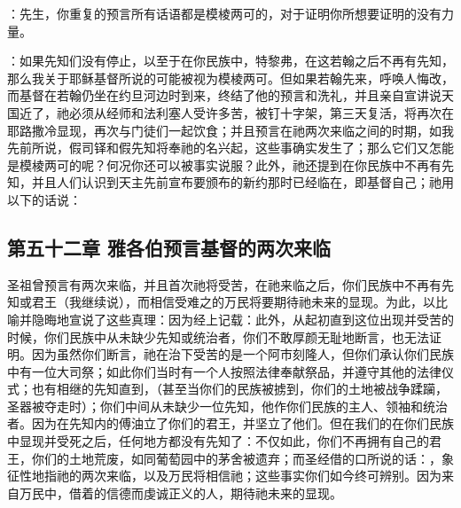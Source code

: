 ：先生，你重复的预言所有话语都是模棱两可的，对于证明你所想要证明的没有力量。\par

：如果先知们没有停止，以至于在你民族中，特黎弗，在这若翰之后不再有先知，那么我关于耶稣基督所说的可能被视为模棱两可。但如果若翰先来，呼唤人悔改，而基督在若翰仍坐在约旦河边时到来，终结了他的预言和洗礼，并且亲自宣讲说天国近了，祂必须从经师和法利塞人受许多苦，被钉十字架，第三天复活，将再次在耶路撒冷显现，再次与门徒们一起饮食；并且预言在祂两次来临之间的时期，如我先前所说，假司铎和假先知将奉祂的名兴起，这些事确实发生了；那么它们又怎能是模棱两可的呢？何况你还可以被事实说服？此外，祂还提到在你民族中不再有先知，并且人们认识到天主先前宣布要颁布的新约那时已经临在，即基督自己；祂用以下的话说：\par


\subsection{第五十二章 雅各伯预言基督的两次来临}

圣祖曾预言有两次来临，并且首次祂将受苦，在祂来临之后，你们民族中不再有先知或君王（我继续说），而相信受难之的万民将要期待祂未来的显现。为此，以比喻并隐晦地宣说了这些真理：因为经上记载：此外，从起初直到这位出现并受苦的时候，你们民族中从未缺少先知或统治者，你们不敢厚颜无耻地断言，也无法证明。因为虽然你们断言，祂在治下受苦的是一个阿市刻隆人，但你们承认你们民族中有一位大司祭；如此你们当时有一个人按照法律奉献祭品，并遵守其他的法律仪式；也有相继的先知直到，（甚至当你们的民族被掳到，你们的土地被战争蹂躏，圣器被夺走时）；你们中间从未缺少一位先知，他作你们民族的主人、领袖和统治者。因为在先知内的傅油立了你们的君王，并坚立了他们。但在我们的在你们民族中显现并受死之后，任何地方都没有先知了：不仅如此，你们不再拥有自己的君王，你们的土地荒废，如同葡萄园中的茅舍被遗弃；而圣经借的口所说的话：，象征性地指祂的两次来临，以及万民将相信祂；这些事实你们如今终可辨别。因为来自万民中，借着的信德而虔诚正义的人，期待祂未来的显现。\par

